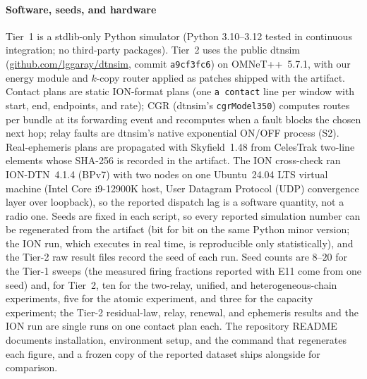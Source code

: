 \documentclass[twocolumn,3p,times,procedia]{elsarticle}
\theoremstyle{plain}
\theoremstyle{remark}
\begin{document}
\paragraph*{Software, seeds, and hardware}
Tier~1 is a stdlib-only Python simulator (Python 3.10--3.12 tested in
continuous integration; no third-party packages). Tier~2 uses the public dtnsim (\url{github.com/lggaray/dtnsim}, commit
\texttt{a9cf3fc6}) on OMNeT++~5.7.1, with our energy
module and $k$-copy router applied as patches shipped with the artifact.
Contact plans are static ION-format plans (one \texttt{a contact} line
per window with start, end, endpoints, and rate); CGR (dtnsim's
\texttt{cgrModel350}) computes routes per bundle at its forwarding event
and recomputes when a fault blocks the chosen next hop; relay faults are
dtnsim's native exponential ON/OFF process (S2). Real-ephemeris plans
are propagated with Skyfield~1.48 from CelesTrak two-line elements whose
SHA-256 is recorded in the artifact. The ION cross-check ran
ION-DTN~4.1.4 (BPv7) with two nodes on one Ubuntu~24.04 LTS virtual
machine (Intel Core i9-12900K host, User Datagram Protocol (UDP)
convergence layer over loopback), so the reported dispatch lag is a
software quantity, not a radio one. Seeds are fixed in each script, so
every reported simulation number can be regenerated from the artifact
(bit for bit on the same Python minor version; the ION run, which
executes in real time, is reproducible only statistically), and the
Tier-2 raw result files record the seed of each run. Seed counts are
$8$--$20$ for the Tier-1 sweeps (the measured firing fractions reported
with E11 come from one seed) and, for Tier~2, ten for the two-relay,
unified, and heterogeneous-chain experiments, five for the atomic
experiment, and three for the capacity experiment; the Tier-2
residual-law, relay, renewal, and ephemeris results and the ION run are
single runs on one contact plan each. The repository README documents
installation, environment setup, and the command that regenerates each
figure, and a frozen copy of the reported dataset ships alongside for
comparison.
\end{document}
